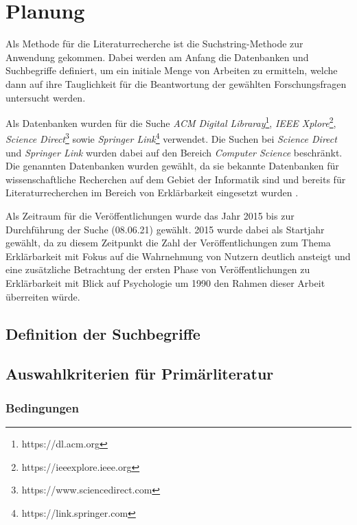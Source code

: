 \section{Planung}

Als Methode für die Literaturrecherche ist die Suchstring-Methode zur Anwendung gekommen. Dabei werden am Anfang die Datenbanken und Suchbegriffe definiert, um ein initiale Menge von Arbeiten zu ermitteln, welche dann auf ihre Tauglichkeit für die Beantwortung der gewählten Forschungsfragen untersucht werden.

Als Datenbanken wurden für die Suche \textit{ACM Digital Libraray}\footnote{https://dl.acm.org}, \textit{IEEE Xplore}\footnote{https://ieeexplore.ieee.org}, \textit{Science Direct}\footnote{https://www.sciencedirect.com} sowie \textit{Springer Link}\footnote{https://link.springer.com} verwendet. Die Suchen bei \textit{Science Direct} und \textit{Springer Link} wurden dabei auf den Bereich \textit{Computer Science} beschränkt. Die genannten Datenbanken wurden gewählt, da sie bekannte Datenbanken für wissenschaftliche Recherchen auf dem Gebiet der Informatik sind \cite{carvalho2017quality} und bereits für Literaturrecherchen im Bereich von Erklärbarkeit eingesetzt wurden \cite{nunes_systematic_2017}.

Als Zeitraum für die Veröffentlichungen wurde das Jahr 2015 bis zur Durchführung der Suche (08.06.21) gewählt. 2015 wurde dabei als Startjahr gewählt, da zu diesem Zeitpunkt die Zahl der Veröffentlichungen zum Thema Erklärbarkeit mit Fokus auf die Wahrnehmung von Nutzern deutlich ansteigt und eine zusätzliche Betrachtung der ersten Phase von Veröffentlichungen zu Erklärbarkeit mit Blick auf Psychologie um 1990 den Rahmen dieser Arbeit überreiten würde.

\subsection{Definition der Suchbegriffe}


\subsection{Auswahlkriterien für Primärliteratur}

\subsubsection{Bedingungen}

